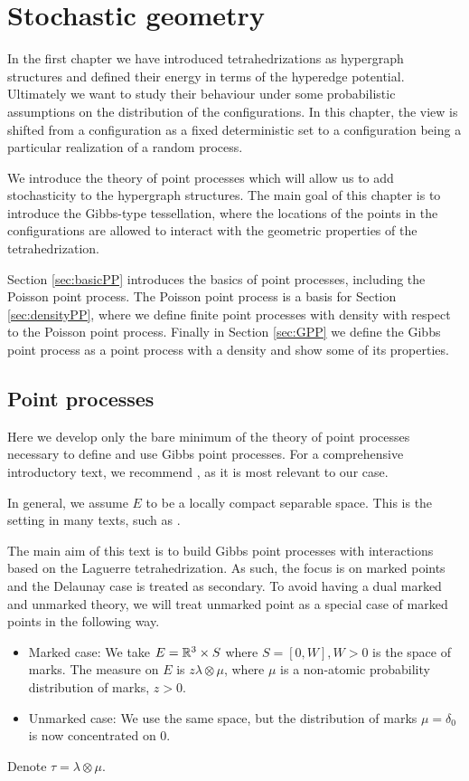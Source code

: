 \chapter{Stochastic geometry}\label{ch:2}
In the first chapter we have introduced tetrahedrizations as hypergraph structures and defined their energy in terms of the hyperedge potential. 
Ultimately we want to study their behaviour under some probabilistic assumptions on the distribution of the configurations. In this chapter, the view is shifted from a configuration as a fixed deterministic set to a configuration being a particular realization of a random process.

We introduce the theory of point processes which will allow us to add stochasticity to the hypergraph structures. The main goal of this chapter is to introduce the Gibbs-type tessellation, where the locations of the points in the configurations are allowed to interact with the geometric properties of the tetrahedrization.

Section \ref{sec:basicPP} introduces the basics of point processes, including the Poisson point process. The Poisson point process is a basis for Section \ref{sec:densityPP}, where we define finite point processes with density with respect to the Poisson point process. Finally in Section \ref{sec:GPP} we define the Gibbs point process as a point process with a density and show some of its properties.

\section{Point processes}
Here we develop only the bare minimum of the theory of point processes necessary to define and use Gibbs point processes. For a comprehensive introductory text, we recommend \cite{MollerWaagepetersen2003}, as it is most relevant to our case. \newline

\noindent In general, we assume $E$ to be a locally compact separable space. This is the setting in many texts, such as \cite{SchneiderWeil2008}.

The main aim of this text is to build Gibbs point processes with interactions based on the Laguerre tetrahedrization. As such, the focus is on marked points and the Delaunay case is treated as secondary. To avoid having a dual marked and unmarked theory, we will treat unmarked point as a special case of marked points in the following way. 

\begin{itemize}
	\item Marked case: We take $E={\mathbb R^3}\times S$ where $S=[0,W],W>0$ is the space of marks. The measure on $E$ is $z\lambda \otimes \mu$, where $\mu$ is a non-atomic  probability distribution of marks, $z>0$. 
	\item Unmarked case: We use the same space, but the distribution of marks $\mu=\delta_0$ is now concentrated on $0$.
\end{itemize}
Denote $\tau = \lambda \otimes \mu$.


